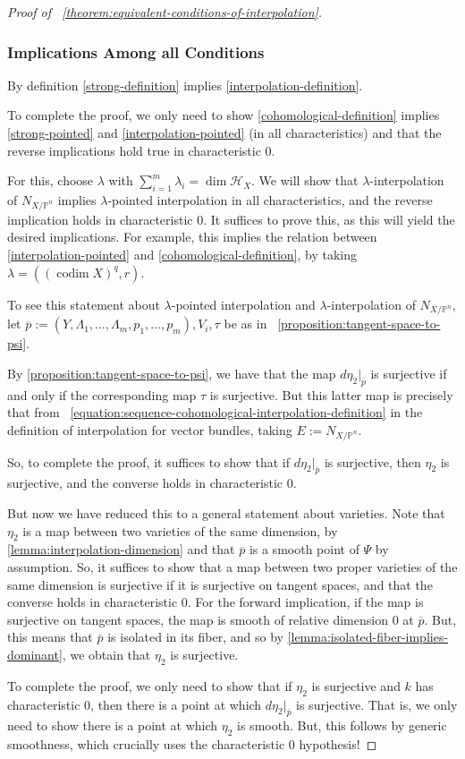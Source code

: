 \documentclass[reqno, 11pt]{amsart}
\theoremstyle{definition}
\theoremstyle{remark}
\numberwithin{equation}{section}
\numberwithin{thm}{section}
\numberwithin{prop}{section}
\numberwithin{lem}{section}
\numberwithin{cor}{section}
\numberwithin{conj}{section}
\numberwithin{defn}{section}
\theoremstyle{plain}
\theoremstyle{definition}
\newcommand\sssec{\subsubsection}
\newcommand\bp{{\mathbb P}}
\newcommand\sch{\mathscr H}
\newcommand \hilb[1]{\sch_{#1}}
\DeclareMathOperator\codim{codim}
\begin{document}
\begin{proof}[Proof of ~\autoref{theorem:equivalent-conditions-of-interpolation}]
\sssec{Implications Among all Conditions}

By definition \ref{strong-definition} implies \ref{interpolation-definition}.

To complete the proof, we only need to show \ref{cohomological-definition}
implies \ref{strong-pointed} and \ref{interpolation-pointed} (in all characteristics)
and that the reverse implications hold true in characteristic $0$.

For this, choose $\lambda$ with $\sum_{i=1}^m \lambda_i = \dim \hilb X$. We will show that $\lambda$-interpolation of $N_{X/\bp^n}$ implies $\lambda$-pointed
interpolation in all characteristics, and the reverse
implication holds in characteristic $0$.
It suffices to prove this, as this will yield the desired implications.
For example, this implies the relation between \ref{interpolation-pointed} and
\ref{cohomological-definition}, by taking $\lambda = \left( (\codim X)^q, r \right)$.

To see this statement about $\lambda$-pointed interpolation and $\lambda$-interpolation of $N_{X/\bp^n}$,
let $\overline p := (Y, \Lambda_1, \ldots, \Lambda_m, p_1, \ldots, p_m), V_i, \tau$ be as in
~\autoref{proposition:tangent-space-to-psi}.

By \autoref{proposition:tangent-space-to-psi}, we have that the map
$d\eta_2|_{\overline{p}}$ is surjective if and only if
the corresponding map $\tau$
is surjective. But this latter map is precisely that from ~\eqref{equation:sequence-cohomological-interpolation-definition}
in the definition of interpolation for vector bundles,
taking $E := N_{X/\bp^n}$.

So, to complete the proof, it suffices to show that if $d\eta_2|_{\overline{p}}$
is surjective, then $\eta_2$ is surjective, and the converse holds in characteristic $0$.

But now we have reduced this to a general statement about varieties.
Note that $\eta_2$ is a map between two varieties of the same dimension, 
by \autoref{lemma:interpolation-dimension} and that $\overline p$
is a smooth point of $\Psi$ by assumption.
So, it suffices to show that a map between two proper varieties of the same
dimension is surjective if it is surjective on tangent spaces,
and that the converse holds in characteristic $0$.
For the forward implication,
if the map is surjective on tangent spaces,
the map is smooth of
relative dimension $0$ at $\overline p$.
But, this means that $\overline p$ is isolated in its fiber, and so by \autoref{lemma:isolated-fiber-implies-dominant},
we obtain that $\eta_2$ is surjective.

To complete the proof, we only need to show that if $\eta_2$ is surjective and $k$ has characteristic
$0$, then there is a point at which $d\eta_2|_{\overline{p}}$ is surjective.
That is, we only need to show there is a point at which $\eta_2$ is smooth.
But, this follows by generic smoothness, which crucially uses the characteristic $0$ hypothesis!
\end{proof}
\end{document}
